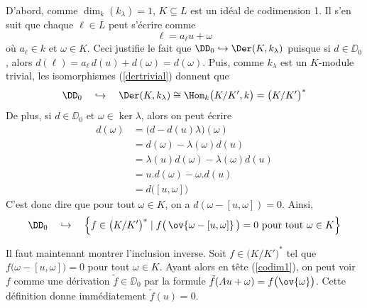 \begin{Prop}
\begin{pre}
D'abord, comme $\dim_k(k_\lambda) = 1$, $K \subseteq L$ est un idéal de codimension 1. Il s'en suit que chaque $\ell \in L$ peut s'écrire comme
\begin{equation} \label{codim1}
\ell = a_\ell u + \omega
\end{equation}  
où $a_\ell \in k$ et $\omega \in K$. Ceci justifie le fait que $\DD_0 \hookrightarrow \Der(K,k_\lambda)$ puisque si $d \in \DD_0$, alors $d(\ell) = a_\ell \, d(u) + d(\omega) = d(\omega)$. Puis, comme $k_\lambda$ est un $K$-module trivial, les isomorphismes (\ref{dertrivial}) donnent que 
$$ \DD_0  \quad \hookrightarrow \quad \Der(K,k_\lambda) \cong \Hom_k\big(K / K',k\big) = \big(K / K'\big)^* $$
De plus, si $d \in \DD_0$ et $\omega \in \ker \lambda$, alors on peut écrire
\begin{align*}
d(\omega) &= \big(d - d(u)\lambda\big)(\omega)\\
&= d(\omega) - \lambda(\omega)d(u)\\
&= \lambda(u)d(\omega) - \lambda(\omega)d(u)\\
&= u.d(\omega) - \omega.d(u)\\
&= d\big([u,\omega]\big)
\end{align*}
C'est donc dire que pour tout $\omega \in K$, on a $d(\omega - [u,\omega]) = 0$. Ainsi, 
$$ \DD_0 \quad \hookrightarrow \quad \Big\{f \in \big(K / K'\big)^* \; | \; f\big(\,\ov{\omega - [u,\omega]}\,\big) = 0 \text{ pour tout } \omega \in K \Big\} $$

Il faut maintenant montrer l'inclusion inverse. Soit $f \in \big(K / K'\big)^*$ tel que $f\big(\omega - [u,\omega]\big) = 0$ pour tout $\omega \in K$. Ayant alors en tête (\ref{codim1}), on peut voir $f$ comme une dérivation $\tilde{f} \in \DD_0$ par la formule $\tilde{f}(Au + \omega) = f\big(\ov{\omega}\big)$. Cette définition donne immédiatement $\tilde{f}(u) = 0$. 


\end{pre}
\end{Prop}
